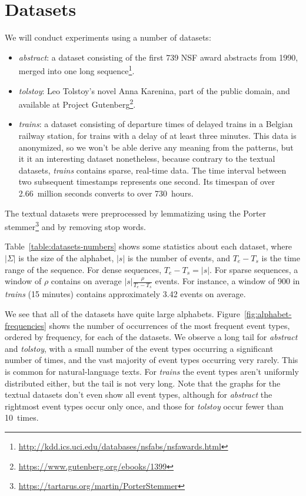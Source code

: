 \section{Datasets}

We will conduct experiments using a number of datasets:

\begin{itemize}
\item \emph{abstract}: a dataset consisting of the first 739 NSF award abstracts from 1990, merged into one long sequence\footnote{\url{http://kdd.ics.uci.edu/databases/nsfabs/nsfawards.html}}.
\item \emph{tolstoy}: Leo Tolstoy's novel Anna Karenina, part of the public domain, and available at Project Gutenberg\footnote{\url{https://www.gutenberg.org/ebooks/1399}}.
\item \emph{trains}: a dataset consisting of departure times of delayed trains in a Belgian railway station, for trains with a delay of at least three minutes. This data is anonymized, so we won't be able derive any meaning from the patterns, but it it an interesting dataset nonetheless, because contrary to the textual datasets, \emph{trains} contains sparse, real-time data. The time interval between two subsequent timestamps represents one second. Its timespan of over 2.66~million seconds converts to over 730~hours.
\end{itemize}

The textual datasets were preprocessed by lemmatizing using the Porter stemmer\footnote{\url{https://tartarus.org/martin/PorterStemmer}} and by removing stop words.

Table~\ref{table:datasets-numbers} shows some statistics about each dataset, where $ | \Sigma | $ is the size of the alphabet, $ | s | $ is the number of events, and $ T_e - T_s $ is the time range of the sequence. For dense sequences, $ T_e - T_s = | s | $. For sparse sequences, a window of $ \rho $ contains on average $ | s | \frac\rho{T_e - T_s} $ events. For instance, a window of 900 in \emph{trains} (15 minutes) contains approximately 3.42 events on average.

We see that all of the datasets have quite large alphabets. Figure~\ref{fig:alphabet-frequencies} shows the number of occurrences of the most frequent event types, ordered by frequency, for each of the datasets. We observe a long tail for \emph{abstract} and \emph{tolstoy}, with a small number of the event types occurring a significant number of times, and the vast majority of event types occurring very rarely. This is common for natural-language texts. For \emph{trains} the event types aren't uniformly distributed either, but the tail is not very long. Note that the graphs for the textual datasets don't even show all event types, although for \emph{abstract} the rightmost event types occur only once, and those for \emph{tolstoy} occur fewer than 10~times.

